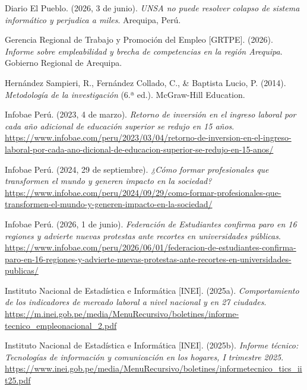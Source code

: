 \documentclass[11pt, a4paper]{article}
\begin{document}
\vspace{0.2cm}
\noindent\hangindent=1.27cm
Diario El Pueblo. (2026, 3 de junio). \textit{UNSA no puede resolver colapso de sistema informático y perjudica a miles}. Arequipa, Perú.

\vspace{0.2cm}
\noindent\hangindent=1.27cm
Gerencia Regional de Trabajo y Promoción del Empleo [GRTPE]. (2026). \textit{Informe sobre empleabilidad y brecha de competencias en la región Arequipa}. Gobierno Regional de Arequipa.

\vspace{0.2cm}
\noindent\hangindent=1.27cm
Hernández Sampieri, R., Fernández Collado, C., \& Baptista Lucio, P. (2014). \textit{Metodología de la investigación} (6.ª ed.). McGraw-Hill Education.

\vspace{0.2cm}
\noindent\hangindent=1.27cm
Infobae Perú. (2023, 4 de marzo). \textit{Retorno de inversión en el ingreso laboral por cada año adicional de educación superior se redujo en 15 años}. \url{https://www.infobae.com/peru/2023/03/04/retorno-de-inversion-en-el-ingreso-laboral-por-cada-ano-dicional-de-educacion-superior-se-redujo-en-15-anos/}

\vspace{0.2cm}
\noindent\hangindent=1.27cm
Infobae Perú. (2024, 29 de septiembre). \textit{¿Cómo formar profesionales que transformen el mundo y generen impacto en la sociedad?} \url{https://www.infobae.com/peru/2024/09/29/como-formar-profesionales-que-transformen-el-mundo-y-generen-impacto-en-la-sociedad/}

\vspace{0.2cm}
\noindent\hangindent=1.27cm
Infobae Perú. (2026, 1 de junio). \textit{Federación de Estudiantes confirma paro en 16 regiones y advierte nuevas protestas ante recortes en universidades públicas}. \url{https://www.infobae.com/peru/2026/06/01/federacion-de-estudiantes-confirma-paro-en-16-regiones-y-advierte-nuevas-protestas-ante-recortes-en-universidades-publicas/}

\vspace{0.2cm}
\noindent\hangindent=1.27cm
Instituto Nacional de Estadística e Informática [INEI]. (2025a). \textit{Comportamiento de los indicadores de mercado laboral a nivel nacional y en 27 ciudades}. \url{https://m.inei.gob.pe/media/MenuRecursivo/boletines/informe-tecnico_empleonacional_2.pdf}

\vspace{0.2cm}
\noindent\hangindent=1.27cm
Instituto Nacional de Estadística e Informática [INEI]. (2025b). \textit{Informe técnico: Tecnologías de información y comunicación en los hogares, I trimestre 2025}. \url{https://www.inei.gob.pe/media/MenuRecursivo/boletines/informetecnico_tics_iit25.pdf}
\end{document}
